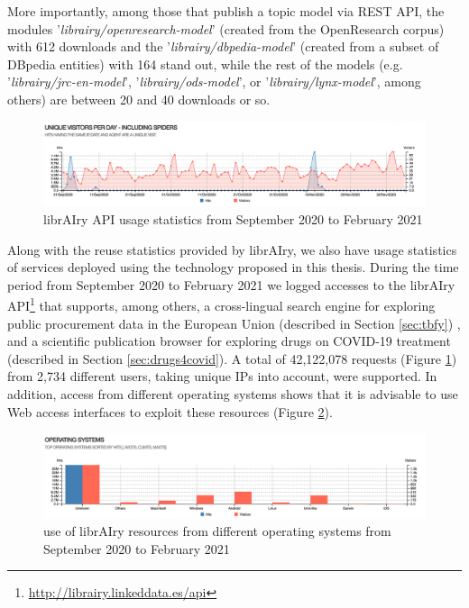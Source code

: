More importantly, among those that publish a topic model via REST API, the modules '\textit{librairy/openresearch-model}' (created from the OpenResearch corpus) with 612 downloads and the '\textit{librairy/dbpedia-model}' (created from a subset of DBpedia entities) with 164 stand out, while the rest of the models (e.g. '\textit{librairy/jrc-en-model}', '\textit{librairy/ods-model}',  or '\textit{librairy/lynx-model}', among others) are between 20 and 40 downloads or so. 

\begin{figure}[ht]
    \centering
    \includegraphics[width=\linewidth]{usage-statistics.png}
    \caption{librAIry API usage statistics from September 2020 to February 2021}
    \label{fig:api-usage}
\end{figure}


Along with the reuse statistics provided by librAIry, we also have usage statistics of services deployed using the technology proposed in this thesis. During the time period from September 2020 to February 2021 we logged accesses to the librAIry API\footnote{\url{http://librairy.linkeddata.es/api}} that supports, among others, a cross-lingual search engine for exploring public procurement data in the European Union (described in Section \ref{sec:tbfy}) , and a scientific publication browser for exploring drugs on COVID-19 treatment  (described in Section \ref{sec:drugs4covid}).  A total of 42,122,078 requests (Figure \ref{fig:api-usage}) from 2,734 different users, taking unique IPs into account, were supported. In addition, access from different operating systems shows that it is advisable to use Web access interfaces to exploit these resources (Figure \ref{fig:so-usage}).


\begin{figure}[ht]
    \centering
    \includegraphics[width=\linewidth]{so-statistics.png}
    \caption{use of librAIry resources from different operating systems from September 2020 to February 2021}
    \label{fig:so-usage}
\end{figure}


